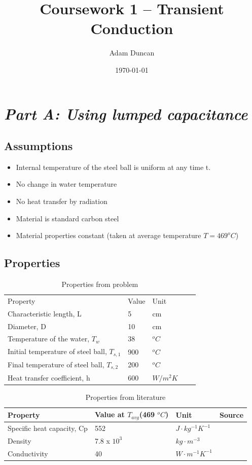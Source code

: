 \documentclass[11pt]{article}
\title{Coursework 1 – Transient Conduction}
\author{Adam Duncan}
\date{\today}
\begin{document}
\maketitle

\section{\emph{Part A: Using lumped capacitance}}
\subsection{Assumptions}
\begin{itemize}
	\item Internal temperature of the steel ball is uniform at any time t.
	\item No change in water temperature
	\item No heat transfer by radiation
	\item Material is standard carbon steel
	\item Material properties constant (taken at average temperature $T = 469 ^{o}C$)
\end{itemize}
\subsection{Properties}
\begin{table}[h]
	\centering
	\caption{Properties from problem}
	\begin{tabular}{lllll}
		Property & Value & Unit &  &  \\ \cline{1-3}
		Characteristic   length, L & 5 & cm &  &  \\
		Diameter, D & 10 & cm &  &  \\
		Temperature   of the water, $T_w$ & 38 & $^oC$ &  &  \\
		Initial   temperature of steel ball, $T_{s,1}$ & 900 & $^oC$ &  &  \\
		Final   temperature of steel ball, $T_{s,2}$ & 200 & $^oC$ &  &  \\
		Heat transfer   coefficient, h & 600 & $W/m^{2}K$ &  & 
	\end{tabular}
	\label{tab1}
\end{table}

\begin{table}[h]
	\centering
	\caption{Properties from literature}
	\begin{tabular}{llll}
		Property & Value at $T_{avg}$(469 $^{o}C$) & Unit & Source \\ \hline
		Specific heat   capacity, Cp & 552 & $J\cdot kg^{-1} K^{-1}$ & \cite{jean-marc_franssen_fire_2015} \\
		Density & 7.8 x $10^3$ & $kg\cdot m^{-3}$ & \cite{bergman_fundamentals_2011} \\
		Conductivity & 40 & $W\cdot m^{-1} K^{-1} $& \cite{jean-marc_franssen_fire_2015}
	\end{tabular}
	\label{tab2}
\end{table}
\FloatBarrier
\end{document}
